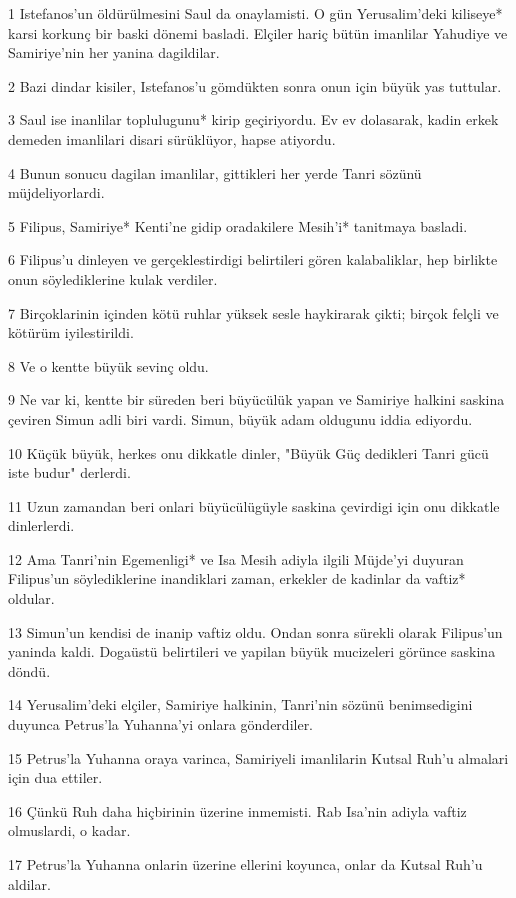 \par 1 Istefanos'un öldürülmesini Saul da onaylamisti. O gün Yerusalim'deki kiliseye* karsi korkunç bir baski dönemi basladi. Elçiler hariç bütün imanlilar Yahudiye ve Samiriye'nin her yanina dagildilar.
\par 2 Bazi dindar kisiler, Istefanos'u gömdükten sonra onun için büyük yas tuttular.
\par 3 Saul ise inanlilar toplulugunu* kirip geçiriyordu. Ev ev dolasarak, kadin erkek demeden imanlilari disari sürüklüyor, hapse atiyordu.
\par 4 Bunun sonucu dagilan imanlilar, gittikleri her yerde Tanri sözünü müjdeliyorlardi.
\par 5 Filipus, Samiriye* Kenti'ne gidip oradakilere Mesih'i* tanitmaya basladi.
\par 6 Filipus'u dinleyen ve gerçeklestirdigi belirtileri gören kalabaliklar, hep birlikte onun söylediklerine kulak verdiler.
\par 7 Birçoklarinin içinden kötü ruhlar yüksek sesle haykirarak çikti; birçok felçli ve kötürüm iyilestirildi.
\par 8 Ve o kentte büyük sevinç oldu.
\par 9 Ne var ki, kentte bir süreden beri büyücülük yapan ve Samiriye halkini saskina çeviren Simun adli biri vardi. Simun, büyük adam oldugunu iddia ediyordu.
\par 10 Küçük büyük, herkes onu dikkatle dinler, "Büyük Güç dedikleri Tanri gücü iste budur" derlerdi.
\par 11 Uzun zamandan beri onlari büyücülügüyle saskina çevirdigi için onu dikkatle dinlerlerdi.
\par 12 Ama Tanri'nin Egemenligi* ve Isa Mesih adiyla ilgili Müjde'yi duyuran Filipus'un söylediklerine inandiklari zaman, erkekler de kadinlar da vaftiz* oldular.
\par 13 Simun'un kendisi de inanip vaftiz oldu. Ondan sonra sürekli olarak Filipus'un yaninda kaldi. Dogaüstü belirtileri ve yapilan büyük mucizeleri görünce saskina döndü.
\par 14 Yerusalim'deki elçiler, Samiriye halkinin, Tanri'nin sözünü benimsedigini duyunca Petrus'la Yuhanna'yi onlara gönderdiler.
\par 15 Petrus'la Yuhanna oraya varinca, Samiriyeli imanlilarin Kutsal Ruh'u almalari için dua ettiler.
\par 16 Çünkü Ruh daha hiçbirinin üzerine inmemisti. Rab Isa'nin adiyla vaftiz olmuslardi, o kadar.
\par 17 Petrus'la Yuhanna onlarin üzerine ellerini koyunca, onlar da Kutsal Ruh'u aldilar.

